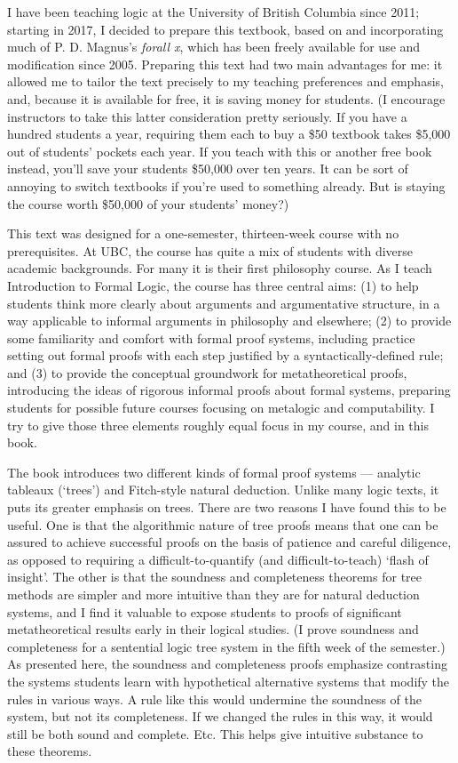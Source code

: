 I have been teaching logic at the University of British Columbia since 2011; starting in 2017, I decided to prepare this textbook, based on and incorporating much of P. D. Magnus's \emph{forall x}, which has been freely available for use and modification since 2005. Preparing this text had two main advantages for me: it allowed me to tailor the text precisely to my teaching preferences and emphasis, and, because it is available for free, it is saving money for students. (I encourage instructors to take this latter consideration pretty seriously. If you have a hundred students a year, requiring them each to buy a \$50 textbook takes \$5,000 out of students' pockets each year. If you teach with this or another free book instead, you'll save your students \$50,000 over ten years. It can be sort of annoying to switch textbooks if you're used to something already. But is staying the course worth \$50,000 of your students' money?)

This text was designed for a one-semester, thirteen-week course with no prerequisites. At UBC, the course has quite a mix of students with diverse academic backgrounds. For many it is their first philosophy course. As I teach Introduction to Formal Logic, the course has three central aims: (1) to help students think more clearly about arguments and argumentative structure, in a way applicable to informal arguments in philosophy and elsewhere; (2) to provide some familiarity and comfort with formal proof systems, including practice setting out formal proofs with each step justified by a syntactically-defined rule; and (3) to provide the conceptual groundwork for metatheoretical proofs, introducing the ideas of rigorous informal proofs about formal systems, preparing students for possible future courses focusing on metalogic and computability. I try to give those three elements roughly equal focus in my course, and in this book.

The book introduces two different kinds of formal proof systems --- analytic tableaux (`trees') and Fitch-style natural deduction. Unlike many logic texts, it puts its greater emphasis on trees. There are two reasons I have found this to be useful. One is that the algorithmic nature of tree proofs means that one can be assured to achieve successful proofs on the basis of patience and careful diligence, as opposed to requiring a difficult-to-quantify (and difficult-to-teach) `flash of insight'. The other is that the soundness and completeness theorems for tree methods are simpler and more intuitive than they are for natural deduction systems, and I find it valuable to expose students to proofs of significant metatheoretical results early in their logical studies. (I prove soundness and completeness for a sentential logic tree system in the fifth week of the semester.) As presented here, the soundness and completeness proofs emphasize contrasting the systems students learn with hypothetical alternative systems that modify the rules in various ways. A rule like this would undermine the soundness of the system, but not its completeness. If we changed the rules in this way, it would still be both sound and complete. Etc. This helps give intuitive substance to these theorems.

